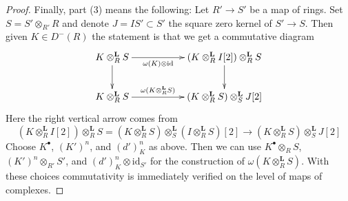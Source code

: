 \documentclass[10pt,a4paper]{amsart}
\theoremstyle{plain}
\theoremstyle{definition}
\theoremstyle{remark}
\numberwithin{equation}{subsection}
\begin{document}
\begin{proof}
\medskip\noindent
Finally, part (3) means the following: Let $R' \to S'$ be a map of
rings. Set $S = S' \otimes_{R'} R$ and denote $J = IS' \subset S'$
the square zero kernel of $S' \to S$. Then given $K \in D^-(R)$
the statement is that we get a commutative diagram
$$
\xymatrix{
K \otimes_R^\mathbf{L} S \ar[d] \ar[rr]_-{\omega(K) \otimes \text{id}} & &
(K \otimes^\mathbf{L}_R I[2]) \otimes_R^\mathbf{L} S \ar[d] \\
K \otimes_R^\mathbf{L} S \ar[rr]^-{\omega(K \otimes_R^\mathbf{L} S)} & &
(K \otimes_R^\mathbf{L} S) \otimes^\mathbf{L}_S J[2]
}
$$
Here the right vertical arrow comes from
$$
(K \otimes^\mathbf{L}_R I[2]) \otimes_R^\mathbf{L} S =
(K \otimes_R^\mathbf{L} S) \otimes_S^\mathbf{L}
(I \otimes_R^\mathbf{L} S)[2] \longrightarrow
(K \otimes_R^\mathbf{L} S) \otimes_S^\mathbf{L} J[2]
$$
Choose $K^\bullet$, $(K')^n$, and $(d')^n_K$ as above.
Then we can use $K^\bullet \otimes_R S$, $(K')^n \otimes_{R'} S'$, and
$(d')^n_K \otimes \text{id}_{S'}$ for the construction of
$\omega(K \otimes_R^\mathbf{L} S)$.
With these choices commutativity
is immediately verified on the level of maps of complexes.
\end{proof}
\end{document}
